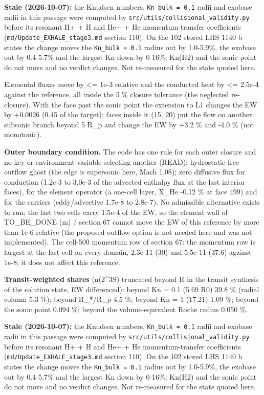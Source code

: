 \documentclass[english,a4paper]{my_memo}
\begin{document}
\textbf{Stale (2026-10-07):} the Knudsen numbers, \texttt{Kn\_bulk\ =\ 0.1} radii and exobase radii in this passage were computed by \texttt{src/utils/collisional\_validity.py} before its resonant H+ + H and He+ + He momentum-transfer coefficients (\texttt{md/Update\_EXHALE\_stage3.md} section 110). On the 102 stored LHS 1140 b states the change moves the \texttt{Kn\_bulk\ =\ 0.1} radius out by 1.0-5.9\%, the exobase out by 0.4-5.7\% and the largest Kn down by 0-16\%; Kn(H2) and the sonic point do not move and no verdict changes. Not re-measured for the state quoted here.

Elemental fluxes move by \textless= 1e-3 relative and the conducted heat by
\textless= 2.5e-4 against the reference, all inside the 5 \% closure tolerance
(the neglected re-closure). With the face past the sonic point the
extension to L1 changes the EW by +0.0026 (0.45 of the target); faces
inside it (15, 20) put the flow on another subsonic branch beyond 5 R\_p and
change the EW by +3.2 \% and -4.0 \% (not monotonic).

\textbf{Outer boundary condition.} The code has one rule for each outer closure
and no key or environment variable selecting another (READ): hydrostatic
free-outflow ghost (the edge is supersonic here, Mach 1.08); zero diffusive
flux for conduction (1.2e-3 to 3.0e-3 of the advected enthalpy flux at the
last interior faces), for the element operator (a one-cell layer, X\_He
-0.12 \% at face 499) and for the carriers (eddy/advective 1.7e-8 to 2.8e-7).
No admissible alternative exists to run; the last two cells carry 1.5e-4 of
the EW, so the element wall of TO\_BE\_DONE (m) / section 67 cannot move the
EW of this reference by more than 1e-6 relative (the proposed outflow
option is not needed here and was not implemented). The cell-500 momentum
row of section 67: the momentum row is largest at the last cell on every
domain, 2.3e-11 (30) and 5.5e-11 (37.6) against 1e-8; it does not affect
this reference.

\textbf{Transit-weighted shares} (n(2\^{}3S) truncated beyond R in the transit
synthesis of the solution state, EW differenced): beyond Kn = 0.1
(5.69 R0) 39.8 \% (radial column 5.3 \%); beyond R\_*/R\_p 4.5 \%; beyond
Kn = 1 (17.21) 1.09 \%; beyond the sonic point 0.094 \%; beyond the
volume-equivalent Roche radius 0.050 \%.

\textbf{Stale (2026-10-07):} the Knudsen numbers, \texttt{Kn\_bulk\ =\ 0.1} radii and exobase radii in this passage were computed by \texttt{src/utils/collisional\_validity.py} before its resonant H+ + H and He+ + He momentum-transfer coefficients (\texttt{md/Update\_EXHALE\_stage3.md} section 110). On the 102 stored LHS 1140 b states the change moves the \texttt{Kn\_bulk\ =\ 0.1} radius out by 1.0-5.9\%, the exobase out by 0.4-5.7\% and the largest Kn down by 0-16\%; Kn(H2) and the sonic point do not move and no verdict changes. Not re-measured for the state quoted here.
\end{document}

